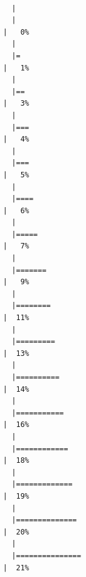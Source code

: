 \documentclass[
  letterpaper,
  DIV=11,
  numbers=noendperiod]{scrartcl}
\begin{document}
\begin{verbatim}

  |                                                                            
  |                                                                      |   0%
  |                                                                            
  |=                                                                     |   1%
  |                                                                            
  |==                                                                    |   3%
  |                                                                            
  |===                                                                   |   4%
  |                                                                            
  |===                                                                   |   5%
  |                                                                            
  |====                                                                  |   6%
  |                                                                            
  |=====                                                                 |   7%
  |                                                                            
  |=======                                                               |   9%
  |                                                                            
  |========                                                              |  11%
  |                                                                            
  |=========                                                             |  13%
  |                                                                            
  |==========                                                            |  14%
  |                                                                            
  |===========                                                           |  16%
  |                                                                            
  |============                                                          |  18%
  |                                                                            
  |=============                                                         |  19%
  |                                                                            
  |==============                                                        |  20%
  |                                                                            
  |===============                                                       |  21%

\end{verbatim}
\end{document}
